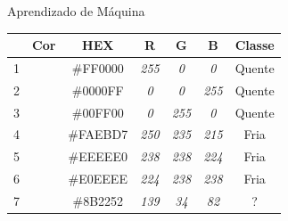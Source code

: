   \begin{frame}[fragile]{Aprendizado de Máquina}
    \begin{table}[]
    \centering
    \label{my-label}
    \begin{tabular}{l|c|c|c|c|c|c|}
    \cline{2-7}
                            & \textbf{Cor}           & \textbf{HEX} & \textbf{R}   & \textbf{G}   & \textbf{B}   & \textbf{Classe} \\ \hline
    \multicolumn{1}{|l|}{1} & \cellcolor[HTML]{FF0000} & \#FF0000     & \textit{255} & \textit{0}   & \textit{0}   & Quente          \\ \hline
    \multicolumn{1}{|l|}{2} & \cellcolor[HTML]{0000FF} & \#0000FF     & \textit{0}   & \textit{0}   & \textit{255} & Quente          \\ \hline
    \multicolumn{1}{|l|}{3} & \cellcolor[HTML]{00FF00} & \#00FF00     & \textit{0}   & \textit{255} & \textit{0}   & Quente          \\ \hline
    \multicolumn{1}{|l|}{4} & \cellcolor[HTML]{FAEBD7} & \#FAEBD7     & \textit{250} & \textit{235} & \textit{215} & Fria            \\ \hline
    \multicolumn{1}{|l|}{5} & \cellcolor[HTML]{EEEEE0} & \#EEEEE0     & \textit{238} & \textit{238} & \textit{224} & Fria            \\ \hline
    \multicolumn{1}{|l|}{6} & \cellcolor[HTML]{E0EEEE} & \#E0EEEE     & \textit{224} & \textit{238} & \textit{238} & Fria            \\ \hline
    \multicolumn{1}{|l|}{7} & \cellcolor[HTML]{8B2252} & \#8B2252     & \textit{139} & \textit{34}  & \textit{82}  & ?               \\ \hline
    \end{tabular}
    \end{table}
  \end{frame}

